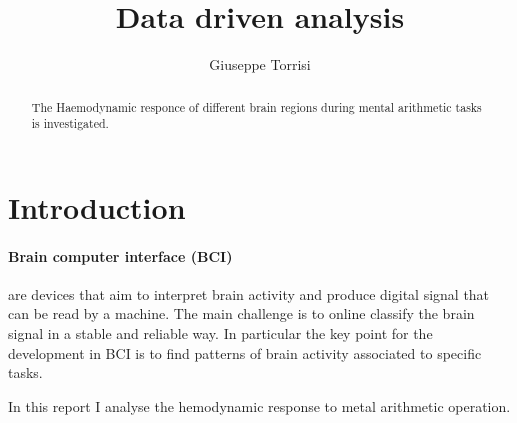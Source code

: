 \documentclass[preprint,12pt]{elsarticle}
\begin{document}
\begin{frontmatter}


\title{Data driven analysis }




\author{Giuseppe Torrisi}

\address{King's College, London}

\begin{abstract}
The Haemodynamic  responce  of  different brain regions during mental arithmetic tasks is investigated.  
\end{abstract}
\end{frontmatter}
\tableofcontents

\section{Introduction}
\paragraph{Brain computer interface (BCI)} are devices that aim to interpret brain activity and produce  digital signal that can be read by  a machine. The main challenge is to online classify the brain signal in a  stable and reliable way. In particular the key point for the development in BCI is to find patterns of brain activity associated to specific tasks. 

In this report I analyse the hemodynamic response to metal arithmetic operation.
\end{document}

